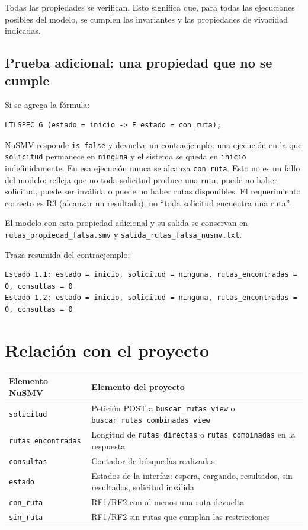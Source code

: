 \documentclass[11pt,a4paper]{article}
\begin{document}
Todas las propiedades se verifican. Esto significa que, para todas las ejecuciones posibles del modelo, se cumplen las invariantes y las propiedades de vivacidad indicadas.

\subsection{Prueba adicional: una propiedad que no se cumple}

Si se agrega la fórmula:

\begin{lstlisting}
LTLSPEC G (estado = inicio -> F estado = con_ruta);
\end{lstlisting}

NuSMV responde \texttt{is false} y devuelve un contraejemplo: una ejecución en la que \texttt{solicitud} permanece en \texttt{ninguna} y el sistema se queda en \texttt{inicio} indefinidamente. En esa ejecución nunca se alcanza \texttt{con\_ruta}. Esto no es un fallo del modelo: refleja que no toda solicitud produce una ruta; puede no haber solicitud, puede ser inválida o puede no haber rutas disponibles. El requerimiento correcto es R3 (alcanzar un resultado), no ``toda solicitud encuentra una ruta''.

El modelo con esta propiedad adicional y su salida se conservan en \texttt{rutas\_propiedad\_falsa.smv} y \texttt{salida\_rutas\_falsa\_nusmv.txt}.

Traza resumida del contraejemplo:

\begin{lstlisting}
Estado 1.1: estado = inicio, solicitud = ninguna, rutas_encontradas = 0, consultas = 0
Estado 1.2: estado = inicio, solicitud = ninguna, rutas_encontradas = 0, consultas = 0
\end{lstlisting}

\section{Relación con el proyecto}

\begin{center}
\begin{tabular}{|p{4cm}|p{10cm}|}
\hline
\textbf{Elemento NuSMV} & \textbf{Elemento del proyecto} \\
\hline
\texttt{solicitud} & Petición POST a \texttt{buscar\_rutas\_view} o \texttt{buscar\_rutas\_combinadas\_view} \\
\hline
\texttt{rutas\_encontradas} & Longitud de \texttt{rutas\_directas} o \texttt{rutas\_combinadas} en la respuesta \\
\hline
\texttt{consultas} & Contador de búsquedas realizadas \\
\hline
\texttt{estado} & Estados de la interfaz: espera, cargando, resultados, sin resultados, solicitud inválida \\
\hline
\texttt{con\_ruta} & RF1/RF2 con al menos una ruta devuelta \\
\hline
\texttt{sin\_ruta} & RF1/RF2 sin rutas que cumplan las restricciones \\
\hline
\end{tabular}
\end{center}
\end{document}
